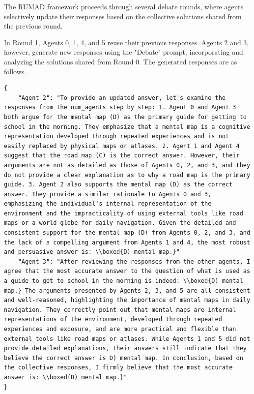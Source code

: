 The RUMAD framework proceeds through several debate rounds, where agents selectively update their responses based on the collective solutions shared from the previous round.

In Round 1, Agents 0, 1, 4, and 5 reuse their previous responses. Agents 2 and 3, however, generate new responses using the "Debate" prompt, incorporating and analyzing the solutions shared from Round 0. The generated responses are as follows.

\begin{lstlisting}[]
{
    "Agent 2": "To provide an updated answer, let's examine the responses from the num_agents step by step: 1. Agent 0 and Agent 3 both argue for the mental map (D) as the primary guide for getting to school in the morning. They emphasize that a mental map is a cognitive representation developed through repeated experiences and is not easily replaced by physical maps or atlases. 2. Agent 1 and Agent 4 suggest that the road map (C) is the correct answer. However, their arguments are not as detailed as those of Agents 0, 2, and 3, and they do not provide a clear explanation as to why a road map is the primary guide. 3. Agent 2 also supports the mental map (D) as the correct answer. They provide a similar rationale to Agents 0 and 3, emphasizing the individual's internal representation of the environment and the impracticality of using external tools like road maps or a world globe for daily navigation. Given the detailed and consistent support for the mental map (D) from Agents 0, 2, and 3, and the lack of a compelling argument from Agents 1 and 4, the most robust and persuasive answer is: \\boxed{D) mental map.}"
    "Agent 3": "After reviewing the responses from the other agents, I agree that the most accurate answer to the question of what is used as a guide to get to school in the morning is indeed: \\boxed{D) mental map.} The arguments presented by Agents 2, 3, and 5 are all consistent and well-reasoned, highlighting the importance of mental maps in daily navigation. They correctly point out that mental maps are internal representations of the environment, developed through repeated experiences and exposure, and are more practical and flexible than external tools like road maps or atlases. While Agents 1 and 5 did not provide detailed explanations, their answers still indicate that they believe the correct answer is D) mental map. In conclusion, based on the collective responses, I firmly believe that the most accurate answer is: \\boxed{D) mental map.}"
}
\end{lstlisting}

